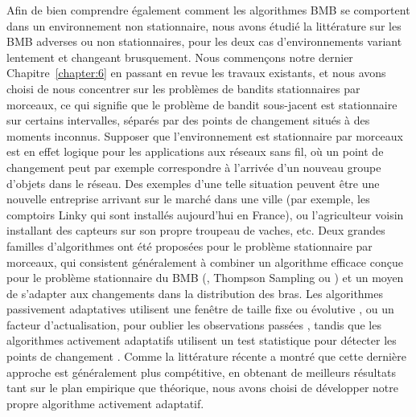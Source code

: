 \begin{resume_fr}
%
Afin de bien comprendre également comment les algorithmes BMB se comportent dans un environnement non stationnaire, nous avons étudié la littérature sur les BMB adverses ou non stationnaires, pour les deux cas d'environnements variant lentement et changeant brusquement.
Nous commençons notre dernier Chapitre~\ref{chapter:6} en passant en revue les travaux existants,
et nous avons choisi de nous concentrer sur les problèmes de bandits stationnaires par morceaux,
ce qui signifie que le problème de bandit sous-jacent est stationnaire sur certains intervalles, séparés par des points de changement situés à des moments inconnus.
Supposer que l'environnement est stationnaire par morceaux est en effet logique pour les applications aux réseaux sans fil, où un point de changement peut par exemple correspondre à l'arrivée d'un nouveau groupe d'objets dans le réseau. Des exemples d'une telle situation peuvent être une nouvelle entreprise arrivant sur le marché dans une ville (par exemple, les comptoirs Linky qui sont installés aujourd'hui en France), ou l'agriculteur voisin installant des capteurs sur son propre troupeau de vaches, etc.
%
Deux grandes familles d'algorithmes ont été proposées pour le problème stationnaire par morceaux,
qui consistent généralement à combiner un algorithme efficace conçue pour le problème stationnaire du BMB (\eg, Thompson Sampling ou \klUCB) et un moyen de s'adapter aux changements dans la distribution des bras.
Les algorithmes passivement adaptatives utilisent une fenêtre de taille fixe ou évolutive \cite{Garivier11UCBDiscount}, ou un facteur d'actualisation, pour oublier les observations passées \cite{Kocsis06,Gupta11thompson},
tandis que les algorithmes activement adaptatifs utilisent un test statistique pour détecter les points de changement \cite{MellorShapiro13,Allesiardo15}.
%
Comme la littérature récente a montré que cette dernière approche est généralement plus compétitive, en obtenant de meilleurs résultats tant sur le plan empirique que théorique, nous avons choisi de développer notre propre algorithme activement adaptatif.


\end{resume_fr}
